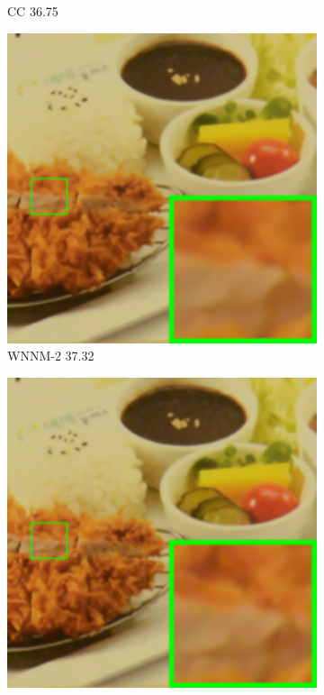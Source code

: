 \begin{figure}
\begin{subfigure}[t]{0.19\textwidth}
		\caption{CC 36.75}
    \end{subfigure}
    \hfill
    \begin{subfigure}[t]{0.19\textwidth}
        \centering
        \includegraphics[width=1\textwidth]{images/mcwnnm/cc/resize_br_WNNMJ_CC15_d800_iso3200_2.png}
		\caption{WNNM-2 37.32}
    \end{subfigure}
    \hfill
    \begin{subfigure}[t]{0.19\textwidth}
        \centering
        \includegraphics[width=1\textwidth]{images/mcwnnm/cc/resize_br_WNNM_ADMM_NL_CC15_d800_iso3200_2.png}

\end{subfigure}
\end{figure}
